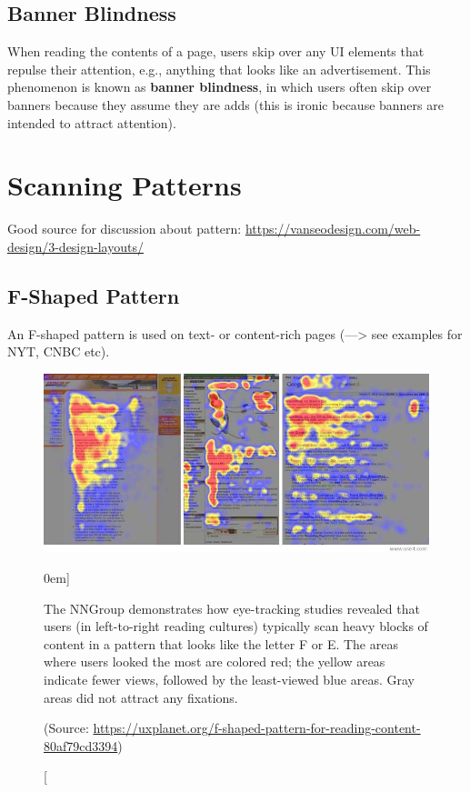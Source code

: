\subsection{Banner Blindness} %
\label{sub:banner_blindness}

When reading the contents of a page, users skip over any UI elements that repulse their attention, e.g., anything that looks like an advertisement. This phenomenon is known as \textbf{banner blindness}, in which users often skip over banners because they assume they are adds (this is ironic because banners are intended to attract attention).







\section{Scanning Patterns} %
\label{sec:scanning_patterns}
Good source for discussion about pattern: \url{https://vanseodesign.com/web-design/3-design-layouts/}

\subsection{F-Shaped Pattern} %
\label{sub:f_shaped_pattern}

An F-shaped pattern is used on text- or content-rich pages (---> see examples for NYT, CNBC etc).

\begin{figure}%
	\centering
  \includegraphics[width=1\textwidth]{../figures/f-pattern_screens.jpeg}
  \caption[][0em]{The NNGroup demonstrates how eye-tracking studies revealed that users (in left-to-right reading cultures) typically scan heavy blocks of content in a pattern that looks like the letter F or E. The areas where users looked the most are colored red; the yellow areas indicate fewer views, followed by the least-viewed blue areas. Gray areas did not attract any fixations. \par (Source: \url{https://uxplanet.org/f-shaped-pattern-for-reading-content-80af79cd3394})}
  \label{fig:f-layout}
\end{figure}

